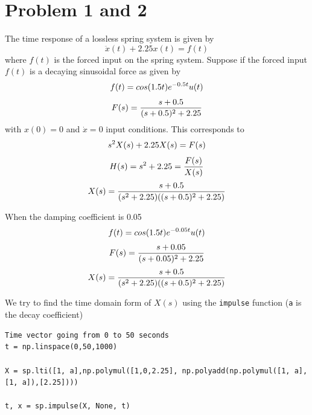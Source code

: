 \documentclass[12pt, a4paper]{report}
\begin{document}
\section*{Problem 1 and 2}
The time response of a lossless spring system is given by
\begin{equation*}
\ddot{x}(t) + 2.25x(t) = f(t)
\end{equation*}
where $f(t)$ is the forced input on the spring system.
Suppose if the forced input $f(t)$ is a decaying sinusoidal force as given by
\begin{equation*}
f(t) = cos(1.5t)e^{-0.5t}u(t)\\
\end{equation*}
\begin{equation*}
F(s) = \frac{s + 0.5}{(s+0.5)^2 + 2.25}\\
\end{equation*}
with $x(0) = 0$ and $\dot{x} = 0$ input conditions. This corresponds to 
\begin{equation*}
s^2X(s) + 2.25X(s) = F(s)\\
\end{equation*}
\begin{equation*}
H(s) = s^2 + 2.25 = \frac{F(s)}{X(s)}\\
\end{equation*}
\begin{equation*}
X(s) = \frac{s+0.5}{(s^2 + 2.25)((s+0.5)^2 + 2.25)}\\
\end{equation*}

When the damping coefficient is 0.05
\begin{equation*}
f(t) = cos(1.5t)e^{-0.05t}u(t)\\
\end{equation*}
\begin{equation*}
F(s) = \frac{s + 0.05}{(s+0.05)^2 + 2.25}\\
\end{equation*}
\begin{equation*}
X(s) = \frac{s+0.5}{(s^2 + 2.25)((s+0.5)^2 + 2.25)}\\
\end{equation*}

\clearpage
We try to find the time domain form of $X(s)$ using the \texttt{impulse} function
(\texttt{a} is the decay coefficient)
\begin{verbatim}
Time vector going from 0 to 50 seconds 
t = np.linspace(0,50,1000)

X = sp.lti([1, a],np.polymul([1,0,2.25], np.polyadd(np.polymul([1, a],[1, a]),[2.25])))

t, x = sp.impulse(X, None, t)
\end{verbatim}
\end{document}
